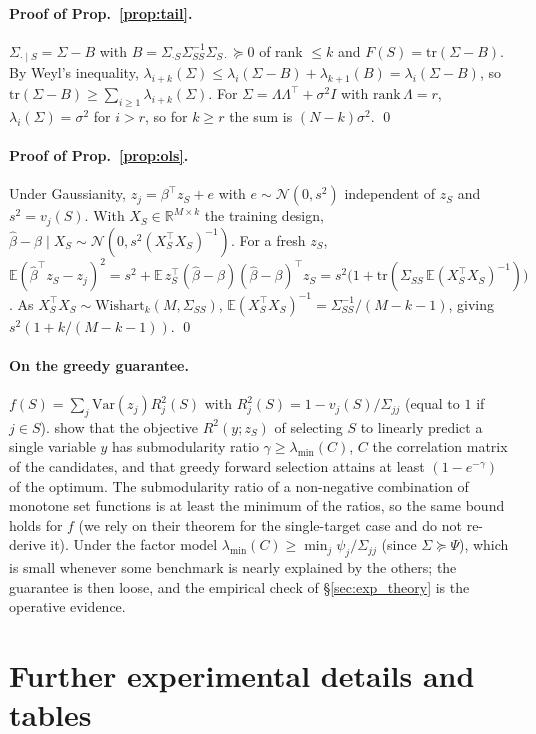 \paragraph{Proof of Prop.~\ref{prop:tail}.}
$\Sigma_{\cdot\mid S}=\Sigma-B$ with $B=\Sigma_{\cdot S}\Sigma_{SS}^{-1}\Sigma_{S\cdot}\succeq0$ of rank $\le k$ and $F(S)=\mathrm{tr}(\Sigma-B)$. By Weyl's inequality, $\lambda_{i+k}(\Sigma)\le\lambda_i(\Sigma-B)+\lambda_{k+1}(B)=\lambda_i(\Sigma-B)$, so $\mathrm{tr}(\Sigma-B)\ge\sum_{i\ge1}\lambda_{i+k}(\Sigma)$. For $\Sigma=\Lambda\Lambda^\top+\sigma^2I$ with $\mathrm{rank}\,\Lambda=r$, $\lambda_i(\Sigma)=\sigma^2$ for $i>r$, so for $k\ge r$ the sum is $(N-k)\sigma^2$. \qed

\paragraph{Proof of Prop.~\ref{prop:ols}.}
Under Gaussianity, $z_j=\beta^\top z_S+e$ with $e\sim\mathcal N(0,s^2)$ independent of $z_S$ and $s^2=v_j(S)$. With $X_S\in\mathbb{R}^{M\times k}$ the training design, $\hat\beta-\beta\mid X_S\sim\mathcal N(0,s^2(X_S^\top X_S)^{-1})$. For a fresh $z_S$, $\mathbb{E}(\hat\beta^\top z_S-z_j)^2=s^2+\mathbb{E}\,z_S^\top(\hat\beta-\beta)(\hat\beta-\beta)^\top z_S=s^2\big(1+\mathrm{tr}(\Sigma_{SS}\,\mathbb{E}(X_S^\top X_S)^{-1})\big)$. As $X_S^\top X_S\sim\mathrm{Wishart}_k(M,\Sigma_{SS})$, $\mathbb{E}(X_S^\top X_S)^{-1}=\Sigma_{SS}^{-1}/(M-k-1)$, giving $s^2(1+k/(M-k-1))$. \qed

\paragraph{On the greedy guarantee.}
$f(S)=\sum_j\mathrm{Var}(z_j)R_j^2(S)$ with $R^2_j(S)=1-v_j(S)/\Sigma_{jj}$ (equal to $1$ if $j\in S$). \citet{das2011submodular} show that the objective $R^2(y;z_S)$ of selecting $S$ to linearly predict a single variable $y$ has submodularity ratio $\gamma\ge\lambda_{\min}(C)$, $C$ the correlation matrix of the candidates, and that greedy forward selection attains at least $(1-e^{-\gamma})$ of the optimum. The submodularity ratio of a non-negative combination of monotone set functions is at least the minimum of the ratios, so the same bound holds for $f$ (we rely on their theorem for the single-target case and do not re-derive it). Under the factor model $\lambda_{\min}(C)\ge\min_j\psi_j/\Sigma_{jj}$ (since $\Sigma\succeq\Psi$), which is small whenever some benchmark is nearly explained by the others; the guarantee is then loose, and the empirical check of \S\ref{sec:exp_theory} is the operative evidence.

\section{Further experimental details and tables}
\label{app:details}
